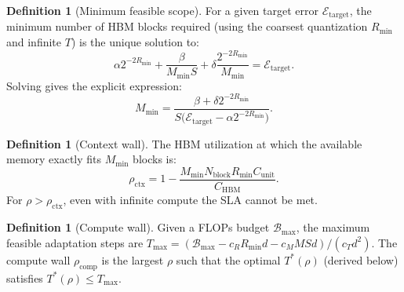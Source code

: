 \documentclass[11pt,a4paper]{article}
\theoremstyle{plain}
\theoremstyle{definition}
\newtheorem{definition}[theorem]{Definition}
\begin{document}
\begin{definition}[Minimum feasible scope]
For a given target error $\mathcal{E}_{\text{target}}$, the minimum number of HBM blocks required (using the coarsest quantization $R_{\min}$ and infinite $T$) is the unique solution to:
\begin{equation}
    \alpha 2^{-2R_{\min}} + \frac{\beta}{M_{\min} S} + \delta \frac{2^{-2R_{\min}}}{M_{\min}} = \mathcal{E}_{\text{target}}.
\end{equation}
Solving gives the explicit expression:
\begin{equation}
    M_{\min} = \frac{\beta + \delta 2^{-2R_{\min}}}{S\bigl(\mathcal{E}_{\text{target}}-\alpha 2^{-2R_{\min}}\bigr)}. \label{eq:mmin}
\end{equation}
\end{definition}

\begin{definition}[Context wall]
The HBM utilization at which the available memory exactly fits $M_{\min}$ blocks is:
\begin{equation}
    \rho_{\text{ctx}} = 1 - \frac{M_{\min} N_{\text{block}} R_{\min} C_{\text{unit}}}{C_{\text{HBM}}}. \label{eq:rhoc}
\end{equation}
For $\rho > \rho_{\text{ctx}}$, even with infinite compute the SLA cannot be met.
\end{definition}

\begin{definition}[Compute wall]
Given a FLOPs budget $\mathcal{B}_{\max}$, the maximum feasible adaptation steps are $T_{\max} = (\mathcal{B}_{\max} - c_R R_{\min} d - c_M M S d)/(c_T d^2)$. The compute wall $\rho_{\text{comp}}$ is the largest $\rho$ such that the optimal $T^*(\rho)$ (derived below) satisfies $T^*(\rho) \le T_{\max}$.
\end{definition}
\end{document}
